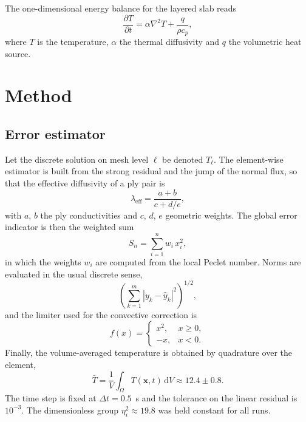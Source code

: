\documentclass[11pt,a4paper]{article}
\begin{document}
The one-dimensional energy balance for the layered slab reads
\begin{equation}
\frac{\partial T}{\partial t} = \alpha \nabla^{2} T + \frac{q}{\rho c_{p}},
\end{equation}
where $T$ is the temperature, $\alpha$ the thermal diffusivity and $q$ the
volumetric heat source.

\section{Method}
\label{sec:method}
\subsection{Error estimator}
Let the discrete solution on mesh level $\ell$ be denoted $T_{\ell}$. The
element-wise estimator is built from the strong residual and the jump of the
normal flux, so that the effective diffusivity of a ply pair is
\begin{equation}
\lambda_{\mathrm{eff}} = \frac{a + b}{c + d/e},
\end{equation}
with $a$, $b$ the ply conductivities and $c$, $d$, $e$ geometric weights. The
global error indicator is then the weighted sum
\begin{equation}
S_{n} = \sum_{i=1}^{n} w_{i}\, x_{i}^{2},
\end{equation}
in which the weights $w_i$ are computed from the local Peclet number. Norms are
evaluated in the usual discrete sense,
\begin{equation}
\left( \sum_{k=1}^{m} \left| y_{k} - \hat{y}_{k} \right|^{2} \right)^{1/2},
\end{equation}
and the limiter used for the convective correction is
\begin{equation}
f(x) =
\begin{cases}
x^{2}, & x \ge 0,\\
-x, & x < 0.
\end{cases}
\end{equation}
Finally, the volume-averaged temperature is obtained by quadrature over the
element,
\begin{equation}
\bar{T} = \frac{1}{V} \int_{\Omega} T(\bm{x}, t) \, \mathrm{d}V \approx 12.4 \pm 0.8 .
\end{equation}
The time step is fixed at $\Delta t = 0.5$~s and the tolerance on the linear
residual is $10^{-3}$. The dimensionless group $\eta_{i}^{2} \approx 19.8$ was
held constant for all runs.
\end{document}
